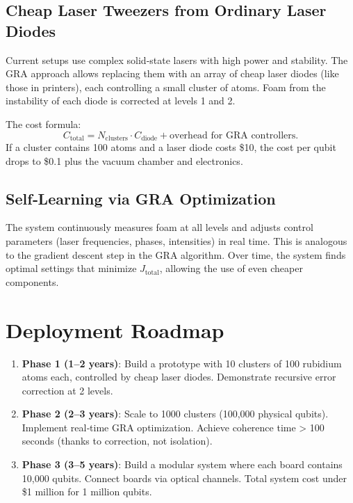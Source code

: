 \documentclass[12pt,a4paper]{article}
\begin{document}
\subsection{Cheap Laser Tweezers from Ordinary Laser Diodes}

Current setups use complex solid‑state lasers with high power and stability. The GRA approach allows replacing them with an array of cheap laser diodes (like those in printers), each controlling a small cluster of atoms. Foam from the instability of each diode is corrected at levels 1 and 2.

The cost formula:
\[
C_{\text{total}} = N_{\text{clusters}} \cdot C_{\text{diode}} + \text{overhead for GRA controllers}.
\]
If a cluster contains 100 atoms and a laser diode costs \$10, the cost per qubit drops to \$0.1 plus the vacuum chamber and electronics.

\subsection{Self‑Learning via GRA Optimization}

The system continuously measures foam at all levels and adjusts control parameters (laser frequencies, phases, intensities) in real time. This is analogous to the gradient descent step in the GRA algorithm. Over time, the system finds optimal settings that minimize \(J_{\text{total}}\), allowing the use of even cheaper components.

\section{Deployment Roadmap}

\begin{enumerate}
    \item \textbf{Phase 1 (1–2 years)}: Build a prototype with 10 clusters of 100 rubidium atoms each, controlled by cheap laser diodes. Demonstrate recursive error correction at 2 levels.
    \item \textbf{Phase 2 (2–3 years)}: Scale to 1000 clusters (100,000 physical qubits). Implement real‑time GRA optimization. Achieve coherence time > 100 seconds (thanks to correction, not isolation).
    \item \textbf{Phase 3 (3–5 years)}: Build a modular system where each board contains 10,000 qubits. Connect boards via optical channels. Total system cost under \$1 million for 1 million qubits.
\end{enumerate}
\end{document}
